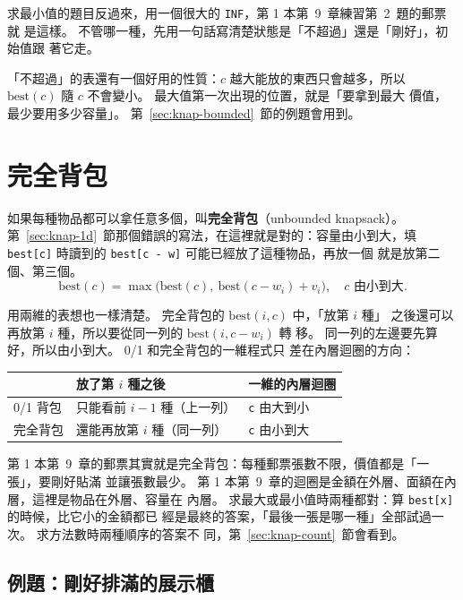 求最小值的題目反過來，用一個很大的 \texttt{INF}，第 1 本第~9~章練習第~2~題的郵票就
是這樣。 不管哪一種，先用一句話寫清楚狀態是「不超過」還是「剛好」，初始值跟
著它走。

「不超過」的表還有一個好用的性質：$c$ 越大能放的東西只會越多，所以
$\mathrm{best}(c)$ 隨 $c$ 不會變小。 最大值第一次出現的位置，就是「要拿到最大
價值，最少要用多少容量」。 第~\ref{sec:knap-bounded}~節的例題會用到。

\section{完全背包}
\label{sec:knap-unbounded}

如果每種物品都可以拿任意多個，叫\textbf{完全背包}（unbounded knapsack）。
第~\ref{sec:knap-1d}~節那個錯誤的寫法，在這裡就是對的：容量由小到大，填
\texttt{best[c]} 時讀到的 \texttt{best[c - w]} 可能已經放了這種物品，再放一個
就是放第二個、第三個。
\[
\mathrm{best}(c) = \max\bigl(\mathrm{best}(c),\ \mathrm{best}(c - w_i) + v_i\bigr),
\quad c \text{ 由小到大}.
\]

用兩維的表想也一樣清楚。 完全背包的 $\mathrm{best}(i, c)$ 中，「放第 $i$ 種」
之後還可以再放第 $i$ 種，所以要從同一列的 $\mathrm{best}(i, c - w_i)$ 轉
移。 同一列的左邊要先算好，所以由小到大。 0/1 和完全背包的一維程式只
差在內層迴圈的方向：

\begin{center}
\begin{tabular}{lll}
\toprule
 & 放了第 $i$ 種之後 & 一維的內層迴圈 \\
\midrule
0/1 背包 & 只能看前 $i - 1$ 種（上一列） & \texttt{c} 由大到小 \\
完全背包 & 還能再放第 $i$ 種（同一列） & \texttt{c} 由小到大 \\
\bottomrule
\end{tabular}
\end{center}

第 1 本第~9~章的郵票其實就是完全背包：每種郵票張數不限，價值都是「一張」，要剛好貼滿
並讓張數最少。 第 1 本第~9~章的迴圈是金額在外層、面額在內層，這裡是物品在外層、容量在
內層。 求最大或最小值時兩種都對：算 \texttt{best[x]} 的時候，比它小的金額都已
經是最終的答案，「最後一張是哪一種」全部試過一次。 求方法數時兩種順序的答案不
同，第~\ref{sec:knap-count}~節會看到。

\subsection{例題：剛好排滿的展示櫃}
\label{sec:ex-shelf}

